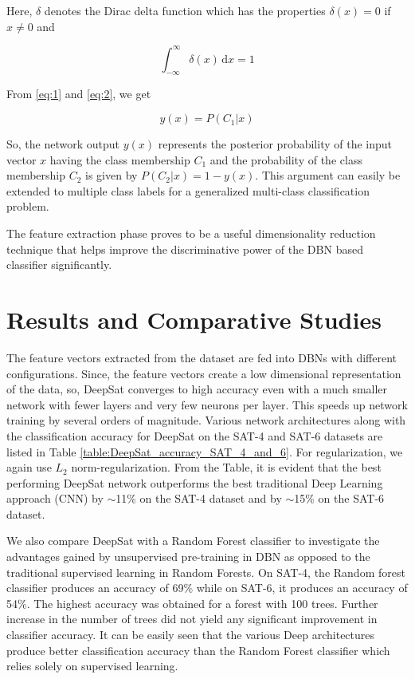 \documentclass[11pt,a4paper]{article}
\begin{document}
Here, $\delta$ denotes the Dirac delta function which has the properties $\delta(x)=0$ if $x \neq 0$ and

\begin{equation}
\int_{-\infty}^{\infty} \delta(x)\,\mathrm{d}x = 1
\end{equation} 

From \ref{eq:1} and \ref{eq:2}, we get

\begin{equation}
y(x)= P(C_1|x)
\end{equation}        							        

So, the network output $y(x)$ represents the posterior probability of the input vector $x$ having the class membership $C_1$ and the probability of the class membership $C_2$ is given by $P(C_2|x) = 1-y(x)$. This argument can easily be extended to multiple class labels for a generalized multi-class classification problem. 

The feature extraction phase proves to be a useful dimensionality reduction technique that helps improve the discriminative power of the DBN based classifier significantly.

\section{Results and Comparative Studies}
The feature vectors extracted from the dataset are fed into DBNs with different configurations. Since, the feature vectors create a low dimensional representation of the data, so, DeepSat converges to high accuracy even with a much smaller network with fewer layers and very few neurons per layer. This speeds up network training by several orders of magnitude. Various network architectures along with the classification accuracy for DeepSat on the SAT-4 and SAT-6 datasets are listed in Table \ref{table:DeepSat_accuracy_SAT_4_and_6}. For regularization, we again use $L_2$ norm-regularization. From the Table, it is evident that the best performing DeepSat network outperforms the best traditional Deep Learning approach (CNN) by ${\sim}$11\% on the SAT-4 dataset and by ${\sim}$15\% on the SAT-6 dataset.    

We also compare DeepSat with a Random Forest classifier to investigate the advantages gained by unsupervised pre-training in DBN as opposed to the traditional supervised learning in Random Forests. On SAT-4, the Random forest classifier produces an accuracy of 69\% while on SAT-6, it produces an accuracy of 54\%. The highest accuracy was obtained for a forest with 100 trees. Further increase in the number of trees did not yield any significant improvement in classifier accuracy. It can be easily seen that the various Deep architectures produce better classification accuracy than the Random Forest classifier which relies solely on supervised learning.    
\end{document}
